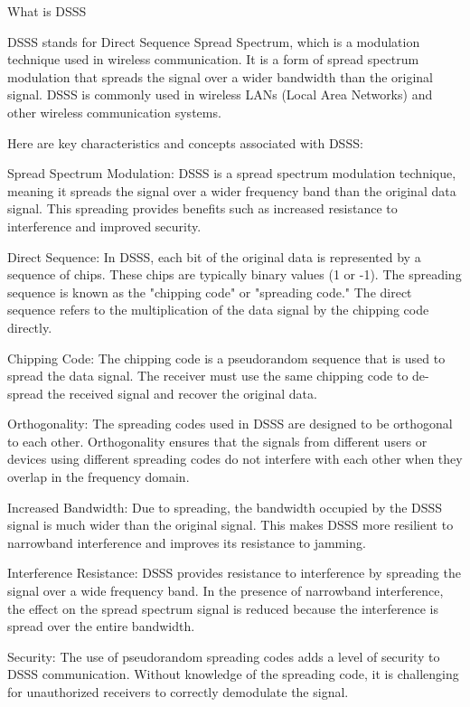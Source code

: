 


What is DSSS

DSSS stands for Direct Sequence Spread Spectrum, which is a modulation technique used in wireless communication. It is a form of spread spectrum modulation that spreads the signal over a wider bandwidth than the original signal. DSSS is commonly used in wireless LANs (Local Area Networks) and other wireless communication systems.

Here are key characteristics and concepts associated with DSSS:

Spread Spectrum Modulation:
DSSS is a spread spectrum modulation technique, meaning it spreads the signal over a wider frequency band than the original data signal. This spreading provides benefits such as increased resistance to interference and improved security.

Direct Sequence:
In DSSS, each bit of the original data is represented by a sequence of chips. These chips are typically binary values (1 or -1). The spreading sequence is known as the "chipping code" or "spreading code." The direct sequence refers to the multiplication of the data signal by the chipping code directly.

Chipping Code:
The chipping code is a pseudorandom sequence that is used to spread the data signal. The receiver must use the same chipping code to de-spread the received signal and recover the original data.

Orthogonality:
The spreading codes used in DSSS are designed to be orthogonal to each other. Orthogonality ensures that the signals from different users or devices using different spreading codes do not interfere with each other when they overlap in the frequency domain.

Increased Bandwidth:
Due to spreading, the bandwidth occupied by the DSSS signal is much wider than the original signal. This makes DSSS more resilient to narrowband interference and improves its resistance to jamming.

Interference Resistance:
DSSS provides resistance to interference by spreading the signal over a wide frequency band. In the presence of narrowband interference, the effect on the spread spectrum signal is reduced because the interference is spread over the entire bandwidth.

Security:
The use of pseudorandom spreading codes adds a level of security to DSSS communication. Without knowledge of the spreading code, it is challenging for unauthorized receivers to correctly demodulate the signal.

